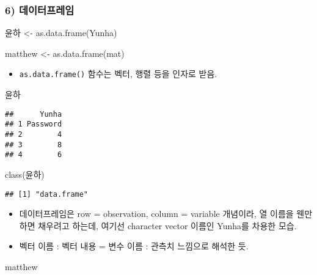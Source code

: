 \documentclass[
  12,
]{article}
\newenvironment{Shaded}{\begin{snugshade}}{\end{snugshade}}
\newcommand{\FunctionTok}[1]{\textcolor[rgb]{0.00,0.00,0.00}{#1}}
\newcommand{\NormalTok}[1]{#1}
\newcommand{\OtherTok}[1]{\textcolor[rgb]{0.56,0.35,0.01}{#1}}
\providecommand{\tightlist}{%
  \setlength{\itemsep}{0pt}\setlength{\parskip}{0pt}}
\begin{document}
\hypertarget{uxb370uxc774uxd130uxd504uxb808uxc784}{%
\subsubsection{6)
데이터프레임}\label{uxb370uxc774uxd130uxd504uxb808uxc784}}

\begin{Shaded}
\begin{Highlighting}[]
\NormalTok{윤하 }\OtherTok{\textless{}{-}} \FunctionTok{as.data.frame}\NormalTok{(Yunha)}

\NormalTok{matthew }\OtherTok{\textless{}{-}} \FunctionTok{as.data.frame}\NormalTok{(mat)}
\end{Highlighting}
\end{Shaded}

\begin{itemize}
\tightlist
\item
  \texttt{as.data.frame()} 함수는 벡터, 행렬 등을 인자로 받음.
\end{itemize}

\begin{Shaded}
\begin{Highlighting}[]
\NormalTok{윤하}
\end{Highlighting}
\end{Shaded}

\begin{verbatim}
##      Yunha
## 1 Password
## 2        4
## 3        8
## 4        6
\end{verbatim}

\begin{Shaded}
\begin{Highlighting}[]
\FunctionTok{class}\NormalTok{(윤하)}
\end{Highlighting}
\end{Shaded}

\begin{verbatim}
## [1] "data.frame"
\end{verbatim}

\begin{itemize}
\item
  데이터프레임은 row = observation, column = variable 개념이라, 열
  이름을 웬만하면 채우려고 하는데, 여기선 character vector 이름인
  Yunha를 차용한 모습.
\item
  벡터 이름 : 벡터 내용 = 변수 이름 : 관측치 느낌으로 해석한 듯.
\end{itemize}

\begin{Shaded}
\begin{Highlighting}[]
\NormalTok{matthew}
\end{Highlighting}
\end{Shaded}
\end{document}
